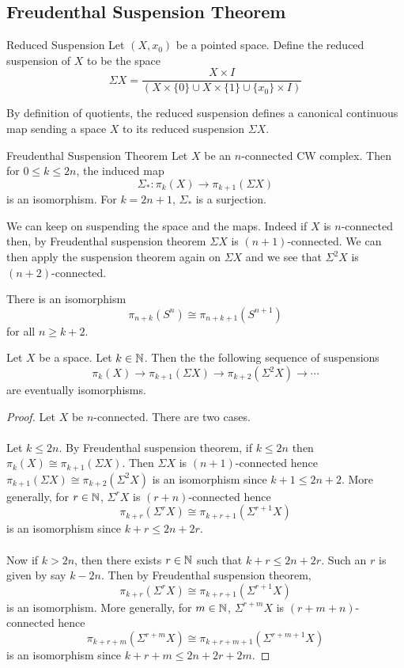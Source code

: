 \documentclass[a4paper]{article}
\begin{document}
\subsection{Freudenthal Suspension Theorem}
\begin{defn}{Reduced Suspension}{} Let $(X,x_0)$ be a pointed space. Define the reduced suspension of $X$ to be the space $$\Sigma X=\frac{X\times I}{(X\times\{0\}\cup X\times\{1\}\cup\{x_0\}\times I)}$$
\end{defn}

By definition of quotients, the reduced suspension defines a canonical continuous map sending a space $X$ to its reduced suspension $\Sigma X$. 

\begin{thm}{Freudenthal Suspension Theorem}{} Let $X$ be an $n$-connected CW complex. Then for $0\leq k\leq 2n$, the induced map $$\Sigma_\ast:\pi_k(X)\to\pi_{k+1}(\Sigma X)$$ is an isomorphism. For $k=2n+1$, $\Sigma_\ast$ is a surjection. 
\end{thm}

We can keep on suspending the space and the maps. Indeed if $X$ is $n$-connected then, by Freudenthal suspension theorem $\Sigma X$ is $(n+1)$-connected. We can then apply the suspension theorem again on $\Sigma X$ and we see that $\Sigma^2X$ is $(n+2)$-connected. 

\begin{crl}{}{} There is an isomorphism $$\pi_{n+k}(S^n)\cong\pi_{n+k+1}(S^{n+1})$$ for all $n\geq k+2$. 
\end{crl}

\begin{prp}{}{} Let $X$ be a space. Let $k\in\mathbb{N}$. Then the the following sequence of suspensions $$\pi_k(X)\to\pi_{k+1}(\Sigma X)\to\pi_{k+2}(\Sigma^2X)\to\cdots$$ are eventually isomorphisms. \tcbline
\begin{proof}
Let $X$ be $n$-connected. There are two cases. \\~\\

Let $k\leq 2n$. By Freudenthal suspension theorem, if $k\leq 2n$ then $\pi_k(X)\cong\pi_{k+1}(\Sigma X)$. Then $\Sigma X$ is $(n+1)$-connected hence $\pi_{k+1}(\Sigma X)\cong\pi_{k+2}(\Sigma^2X)$ is an isomorphism since $k+1\leq 2n+2$. More generally, for $r\in\mathbb{N}$, $\Sigma^rX$ is $(r+n)$-connected hence $$\pi_{k+r}(\Sigma^rX)\cong\pi_{k+r+1}(\Sigma^{r+1}X)$$ is an isomorphism since $k+r\leq 2n+2r$. \\~\\

Now if $k>2n$, then there exists $r\in\mathbb{N}$ such that $k+r\leq 2n+2r$. Such an $r$ is given by say $k-2n$. Then by Freudenthal suspension theorem, $$\pi_{k+r}(\Sigma^rX)\cong\pi_{k+r+1}(\Sigma^{r+1}X)$$ is an isomorphism. More generally, for $m\in\mathbb{N}$, $\Sigma^{r+m}X$ is $(r+m+n)$-connected hence $$\pi_{k+r+m}(\Sigma^{r+m}X)\cong\pi_{k+r+m+1}(\Sigma^{r+m+1}X)$$ is an isomorphism since $k+r+m\leq 2n+2r+2m$. 
\end{proof}
\end{prp}
\end{document}
